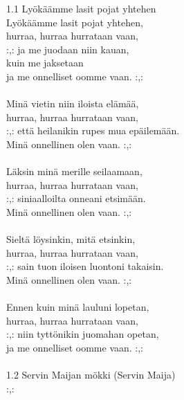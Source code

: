 
1.1 Lyökäämme lasit pojat yhtehen \\ Lyökäämme lasit pojat yhtehen, \\ hurraa, hurraa hurrataan vaan, \\ :,: ja me juodaan niin kauan,  \\ kuin me jaksetaan \\ ja me onnelliset oomme vaan. :,: \\ \hspace{10mm} \\ Minä vietin niin iloista elämää, \\ hurraa, hurraa hurrataan vaan, \\ :,: että heilanikin rupes mua epäilemään. \\ Minä onnellinen olen vaan. :,: \\ \hspace{10mm} \\ Läksin minä merille seilaamaan, \\ hurraa, hurraa hurrataan vaan, \\ :,: siniaalloilta onneani etsimään. \\ Minä onnellinen olen vaan. :,: \\ \hspace{10mm} \\ Sieltä löysinkin, mitä etsinkin, \\ hurraa, hurraa hurrataan vaan, \\ :,: sain tuon iloisen luontoni takaisin. \\ Minä onnellinen olen vaan. :,: \\ \hspace{10mm} \\ Ennen kuin minä lauluni lopetan, \\ hurraa, hurraa hurrataan vaan, \\ :,: niin tyttönikin juomahan opetan, \\ ja me onnelliset oomme vaan. :,: \\ \hspace{10mm} \\ 1.2 Servin Maijan mökki (Servin Maija) \\ :,: 